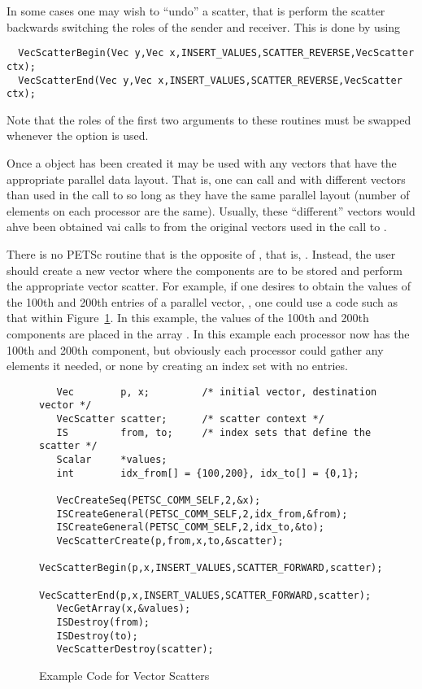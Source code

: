 In some cases one may wish to ``undo'' a scatter, that is perform the 
scatter backwards switching the roles of the sender and receiver. This is 
done by using 
\begin{verbatim}
  VecScatterBegin(Vec y,Vec x,INSERT_VALUES,SCATTER_REVERSE,VecScatter ctx);
  VecScatterEnd(Vec y,Vec x,INSERT_VALUES,SCATTER_REVERSE,VecScatter ctx);
\end{verbatim} 
 Note that the roles of the first 
two arguments to these routines must be swapped whenever the 
option is used.

Once a  object has been created it may be used with any vectors
that have the appropriate parallel data layout. That is, one can call 
 and  with different vectors than 
used in the call to  so long as they have the same 
parallel layout (number of elements on each processor are the same). Usually,
these ``different'' vectors would ahve been obtained vai calls to 
 from the original vectors used in the call to 
.

 
There is no PETSc routine that is the opposite of 
, that is, . 
Instead, the user should create a new vector where
the components are to be stored and perform the appropriate vector 
scatter. For example, if one desires to obtain the values of the 
100th and 200th entries of a parallel vector, , one could use 
a code such as that within Figure~\ref{fig:vecscatter}.
In this example, the values of the 100th and 200th components are
placed in the array 
. In this example each processor now has the 100th and 
200th component, but obviously each processor could gather any 
elements it needed, or none by creating an index set with no entries.

\begin{figure}[tb]
\begin{verbatim}
   Vec        p, x;         /* initial vector, destination vector */
   VecScatter scatter;      /* scatter context */
   IS         from, to;     /* index sets that define the scatter */
   Scalar     *values;
   int        idx_from[] = {100,200}, idx_to[] = {0,1};

   VecCreateSeq(PETSC_COMM_SELF,2,&x);
   ISCreateGeneral(PETSC_COMM_SELF,2,idx_from,&from);
   ISCreateGeneral(PETSC_COMM_SELF,2,idx_to,&to);
   VecScatterCreate(p,from,x,to,&scatter);
   VecScatterBegin(p,x,INSERT_VALUES,SCATTER_FORWARD,scatter);
   VecScatterEnd(p,x,INSERT_VALUES,SCATTER_FORWARD,scatter);
   VecGetArray(x,&values);
   ISDestroy(from);
   ISDestroy(to); 
   VecScatterDestroy(scatter);
\end{verbatim}
\caption{Example Code for Vector Scatters}
\label{fig:vecscatter}
\end{figure}

